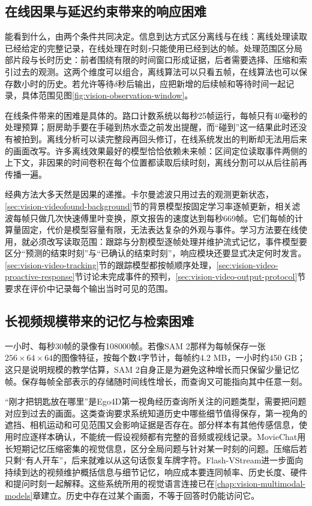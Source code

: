 \subsection{在线因果与延迟约束带来的响应困难}
\label{sec:vision-video-availability}

能看到什么，由两个条件共同决定。信息到达方式区分离线与在线：离线处理读取已经给定的完整记录，在线处理在时刻$\tau$只能使用已经到达的帧。处理范围区分局部片段与长时历史：前者围绕有限的时间窗口形成证据，后者需要选择、压缩和索引过去的观测。这两个维度可以组合，离线算法可以只看五帧，在线算法也可以保存数小时的历史。若允许等待$\delta$秒后输出，应把新增的后续帧和等待时间一起记录，具体范围见图\ref{fig:vision-observation-window}。

在线条件带来的困难是具体的。路口计数系统以每秒25帧运行，每帧只有40毫秒的处理预算；厨房助手要在手碰到热水壶之前发出提醒，而“碰到”这一结果此时还没有被拍到。离线分析可以读完整段再回头修订，在线系统发出的判断却无法用后来的画面改写。许多离线效果最好的模型恰恰依赖未来帧：区间定位读取事件两侧的上下文，非因果的时间卷积在每个位置都读取后续时刻，离线分割可以从后往前再传播一遍。

经典方法大多天然是因果的递推。卡尔曼滤波只用过去的观测更新状态，\ref{sec:vision-videofound-background}节的背景模型按固定学习率逐帧更新，相关滤波每帧只做几次快速傅里叶变换，原文报告的速度达到每秒669帧。它们每帧的计算量固定，代价是模型容量有限，无法表达复杂的外观与事件。学习方法要在线使用，就必须改写读取范围：跟踪与分割模型逐帧处理并维护流式记忆，事件模型要区分“预测的结束时刻”与“已确认的结束时刻”，响应模块还要显式决定何时发言。\ref{sec:vision-video-tracking}节的跟踪模型都按帧顺序处理，\ref{sec:vision-video-proactive-response}节讨论未完成事件的预判，\ref{sec:vision-video-output-protocol}节要求在评价中记录每个输出当时可见的范围。

\subsection{长视频规模带来的记忆与检索困难}
\label{sec:vision-video-challenge-memory}

一小时、每秒30帧的录像有108000帧。若像SAM 2那样为每帧保存一张$256\times64\times64$的图像特征，按每个数4字节计，每帧约4.2 MB，一小时约450 GB；这只是说明规模的教学估算，SAM 2自身正是为避免这种增长而只保留少量记忆帧。保存每帧全部表示的存储随时间线性增长，而查询又可能指向其中任意一刻。

“刚才把钥匙放在哪里”是Ego4D第一视角经历查询所关注的问题类型，需要把问题对应到过去的画面。这类查询要求系统知道历史中哪些细节值得保存，第一视角的遮挡、相机运动和可见范围又会影响证据是否存在。部分样本有其他传感信息，使用时应逐样本确认，不能统一假设视频都有完整的音频或视线记录。MovieChat用长短期记忆压缩密集的视觉信息，区分全局问题与针对某一时刻的问题。压缩后若只剩“有人开车”，后来就难以从这句话恢复车牌字符。Flash-VStream进一步面向持续到达的视频维护概括信息与细节记忆，响应成本要连同帧率、历史长度、硬件和提问时刻一起解释。这些系统所用的视觉语言连接已在\ref{chap:vision-multimodal-models}章建立。历史中存在过某个画面，不等于回答时仍能访问它。

